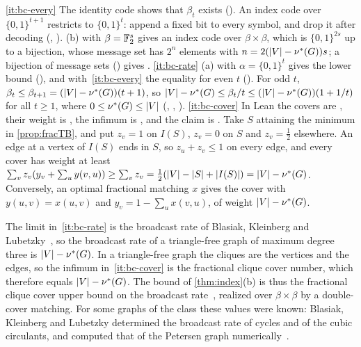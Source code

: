 \begin{outline}
\ref{it:bc-every} The identity code shows that $\beta_t$ exists (). An index code over
$\{0,1\}^{t+1}$ restricts to $\{0,1\}^t$: append a fixed bit to every symbol, and drop it after decoding
(, ). (b) with $\beta=\mathbb{F}_2^s$ gives an index code
over $\beta\times\beta$, which is $\{0,1\}^{2s}$ up to a bijection, whose message set has $2^n$ elements with
$n=2(\lvert V \rvert-\nu^{*}(G))s$; a bijection of message sets () gives
. \ref{it:bc-rate} (a) with $\alpha=\{0,1\}^t$ gives the lower bound
(), and with~\ref{it:bc-every} the equality for even $t$ (). For odd $t$,
$\beta_t\le\beta_{t+1}=(\lvert V \rvert-\nu^{*}(G))(t+1)$, so $\lvert V \rvert-\nu^{*}(G)\le\beta_t/t\le(\lvert V \rvert-\nu^{*}(G))(1+1/t)$
for all $t\ge1$, where $0\le\nu^{*}(G)\le\lvert V \rvert$ (, ,
). \ref{it:bc-cover} In Lean the covers are , their weight is
, the infimum is , and the claim is . Take $S$ attaining the minimum in
\cref{prop:fracTB}, and put $z_v=1$ on $I(S)$, $z_v=0$ on $S$ and $z_v=\frac12$ elsewhere. An edge at a vertex of $I(S)$
ends in $S$, so $z_u+z_v\le1$ on every edge, and every cover has weight at least
$\sum_vz_v(y_v+\sum_uy(v,u))\ge\sum_vz_v=\frac12(\lvert V \rvert-\lvert S \rvert+\lvert I(S) \rvert)=\lvert V \rvert-\nu^{*}(G)$. Conversely, an optimal
fractional matching $x$ gives the cover with $y(u,v)=x(u,v)$ and $y_v=1-\sum_ux(v,u)$, of weight $\lvert V \rvert-\nu^{*}(G)$.
\end{outline}

The limit in~\ref{it:bc-rate} is the broadcast rate of Blasiak, Kleinberg and Lubetzky~\cite{BKL2013}, so the broadcast
rate of a triangle-free graph of maximum degree three is $\lvert V \rvert-\nu^{*}(G)$. In a triangle-free graph the cliques are
the vertices and the edges, so the infimum in~\ref{it:bc-cover} is the fractional clique cover number, which therefore
equals $\lvert V \rvert-\nu^{*}(G)$. The bound of \cref{thm:index}(b) is thus the fractional clique cover upper bound on the
broadcast rate~\cite{BKL2013}, realized over $\beta\times\beta$ by a double-cover matching. For some graphs of the class
these values were known: Blasiak, Kleinberg and Lubetzky determined the broadcast rate of cycles and of the cubic
circulants, and computed that of the Petersen graph numerically~\cite{BKL2013}.

